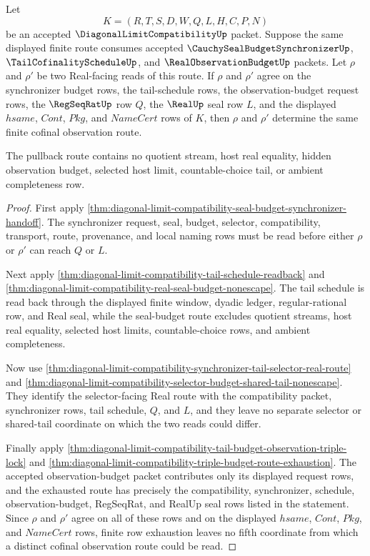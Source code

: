 \begin{theorem}
\label{thm:diagonal-limit-compatibility-synchronizer-observation-cofinal-pullback}
Let
$$
K=(R,T,S,D,W,Q,L,H,C,P,N)
$$
be an accepted $\DiagonalLimitCompatibilityUp$ packet. Suppose the same displayed finite route consumes accepted $\CauchySealBudgetSynchronizerUp$, $\TailCofinalityScheduleUp$, and $\RealObservationBudgetUp$ packets. Let $\rho$ and $\rho'$ be two Real-facing reads of this route. If $\rho$ and $\rho'$ agree on the synchronizer budget rows, the tail-schedule rows, the observation-budget request rows, the $\RegSeqRatUp$ row $Q$, the $\RealUp$ seal row $L$, and the displayed $hsame$, $Cont$, $Pkg$, and $NameCert$ rows of $K$, then $\rho$ and $\rho'$ determine the same finite cofinal observation route.

The pullback route contains no quotient stream, host real equality, hidden observation budget, selected host limit, countable-choice tail, or ambient completeness row.
\end{theorem}
\begin{proof}
First apply \autoref{thm:diagonal-limit-compatibility-seal-budget-synchronizer-handoff}. The synchronizer request, seal, budget, selector, compatibility, transport, route, provenance, and local naming rows must be read before either $\rho$ or $\rho'$ can reach $Q$ or $L$.

Next apply \autoref{thm:diagonal-limit-compatibility-tail-schedule-readback} and \autoref{thm:diagonal-limit-compatibility-real-seal-budget-nonescape}. The tail schedule is read back through the displayed finite window, dyadic ledger, regular-rational row, and Real seal, while the seal-budget route excludes quotient streams, host real equality, selected host limits, countable-choice rows, and ambient completeness.

Now use \autoref{thm:diagonal-limit-compatibility-synchronizer-tail-selector-real-route} and \autoref{thm:diagonal-limit-compatibility-selector-budget-shared-tail-nonescape}. They identify the selector-facing Real route with the compatibility packet, synchronizer rows, tail schedule, $Q$, and $L$, and they leave no separate selector or shared-tail coordinate on which the two reads could differ.

Finally apply \autoref{thm:diagonal-limit-compatibility-tail-budget-observation-triple-lock} and \autoref{thm:diagonal-limit-compatibility-triple-budget-route-exhaustion}. The accepted observation-budget packet contributes only its displayed request rows, and the exhausted route has precisely the compatibility, synchronizer, schedule, observation-budget, RegSeqRat, and RealUp seal rows listed in the statement. Since $\rho$ and $\rho'$ agree on all of these rows and on the displayed $hsame$, $Cont$, $Pkg$, and $NameCert$ rows, finite row exhaustion leaves no fifth coordinate from which a distinct cofinal observation route could be read.
\end{proof}

